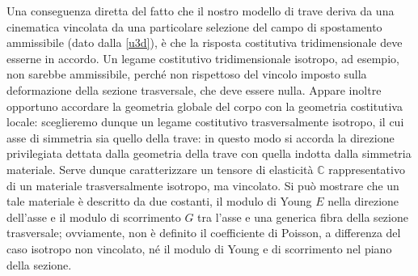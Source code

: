 	Una conseguenza diretta del fatto che il nostro modello di trave deriva da una cinematica vincolata da una particolare selezione del campo di spostamento ammissibile (dato dalla \eqref{u3d}), è che la risposta costitutiva tridimensionale deve esserne in accordo. Un legame costitutivo tridimensionale isotropo, ad esempio, non sarebbe ammissibile, perché non rispettoso del vincolo imposto sulla deformazione della sezione trasversale, che deve essere nulla. Appare inoltre opportuno accordare la geometria globale del corpo con la geometria costitutiva locale: sceglieremo dunque un legame costitutivo trasversalmente isotropo, il cui asse di simmetria sia quello della trave: in questo modo si accorda la direzione privilegiata dettata dalla geometria della trave con quella indotta dalla simmetria materiale. Serve dunque  caratterizzare un tensore di elasticità $\mathbb{C}$ rappresentativo di un materiale trasversalmente isotropo, ma vincolato. Si può mostrare che un tale materiale è descritto da due costanti, il modulo di Young $E$ nella direzione dell'asse e il modulo di scorrimento $G$ tra l'asse e una generica fibra della sezione trasversale; ovviamente, non è definito il coefficiente di Poisson, a differenza del caso isotropo non vincolato, né il modulo di Young e di scorrimento nel piano della sezione. 
	

